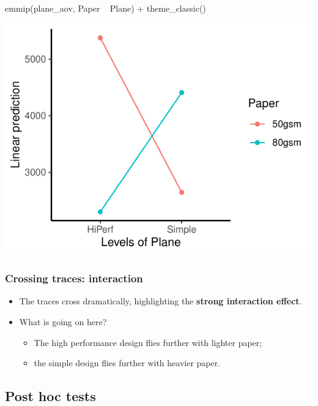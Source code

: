 \documentclass[a4paper]{article}\usepackage[]{graphicx}\usepackage[]{xcolor}
\makeatletter
\def\maxwidth{ %
  \ifdim\Gin@nat@width>\linewidth
    \linewidth
  \else
    \Gin@nat@width
  \fi
}
\makeatother
\begin{document}
\begin{minipage}[t]{0.49\textwidth}
\begin{Schunk}
\begin{Sinput}
emmip(plane_aov, Paper ~ Plane) +
  theme_classic()
\end{Sinput}


{\centering \includegraphics[width=\maxwidth]{figure/listings-unnamed-chunk-325-1} 

}

\end{Schunk}
\end{minipage}
\subsubsection{Crossing traces: interaction}
\begin{itemize}
	\item The traces cross dramatically, highlighting the \textcolor{myred}{\textbf{strong interaction effect}}.
	\item What is going on here?
	\begin{itemize}
		\item The high performance design flies further with lighter paper;
		\item the simple design flies further with heavier paper.
	\end{itemize}
\end{itemize}
\subsection{Post hoc tests}
\end{document}
